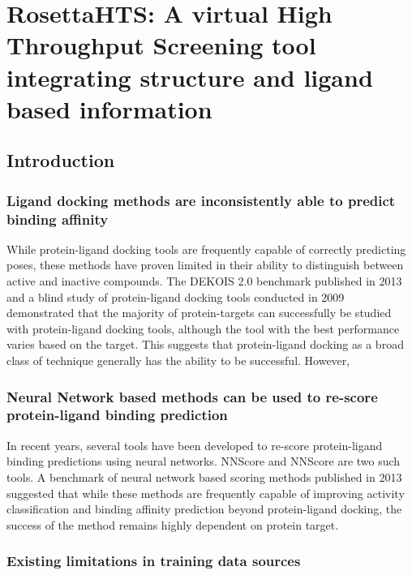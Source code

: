 \chapter{RosettaHTS: A virtual High Throughput Screening tool integrating structure and ligand based information}
\label{chap:rosetta_hts}
\section{Introduction}

\subsection{Ligand docking methods are inconsistently able to predict binding affinity}

While protein-ligand docking tools are frequently capable of correctly predicting poses\citep{Trott:2010km,Friesner:2004hm,Ewing:2001wu}, these methods have proven limited in their ability to distinguish between active and inactive compounds\citep{Bauer:2013de,Huang:2006gi,Davis:2009fx}.
The DEKOIS 2.0 benchmark published in 2013 \citep{Bauer:2013de} and a blind study of protein-ligand docking tools conducted in 2009\citep{Davis:2009fx} demonstrated that the majority of protein-targets can successfully be studied with protein-ligand docking tools, although the tool with the best performance varies based on the target.
This suggests that protein-ligand docking as a broad class of technique generally has the ability to be successful. However,%

\subsection{Neural Network based methods can be used to re-score protein-ligand binding prediction}

In recent years, several tools have been developed to re-score protein-ligand binding predictions using neural networks.
NNScore\citep{Durrant:2010js} and NNScore\citep{Durrant:2011dx} are two such tools.
A benchmark of neural network based scoring methods published in 2013 suggested that while these methods are frequently capable of improving activity classification and binding affinity prediction beyond protein-ligand docking, the success of the method remains highly dependent on protein target.\citep{Durrant:2013db}

\subsection{Existing limitations in training data sources}

